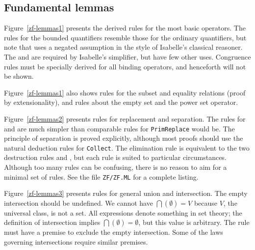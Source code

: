 \subsection{Fundamental lemmas}
Figure~\ref{zf-lemmas1} presents the derived rules for the most basic
operators.  The rules for the bounded quantifiers resemble those for the
ordinary quantifiers, but note that  uses a negated assumption
in the style of Isabelle's classical reasoner.  The   and  are required by Isabelle's
simplifier, but have few other uses.  Congruence rules must be specially
derived for all binding operators, and henceforth will not be shown.

Figure~\ref{zf-lemmas1} also shows rules for the subset and equality
relations (proof by extensionality), and rules about the empty set and the
power set operator.

Figure~\ref{zf-lemmas2} presents rules for replacement and separation.
The rules for  and  are much simpler than
comparable rules for \texttt{PrimReplace} would be.  The principle of
separation is proved explicitly, although most proofs should use the
natural deduction rules for \texttt{Collect}.  The elimination rule
 is equivalent to the two destruction rules
 and , but each rule is suited to
particular circumstances.  Although too many rules can be confusing, there
is no reason to aim for a minimal set of rules.  See the file
\texttt{ZF/ZF.ML} for a complete listing.

Figure~\ref{zf-lemmas3} presents rules for general union and intersection.
The empty intersection should be undefined.  We cannot have
$\bigcap(\emptyset)=V$ because $V$, the universal class, is not a set.  All
expressions denote something in {\ZF} set theory; the definition of
intersection implies $\bigcap(\emptyset)=\emptyset$, but this value is
arbitrary.  The rule  must have a premise to exclude
the empty intersection.  Some of the laws governing intersections require
similar premises.


